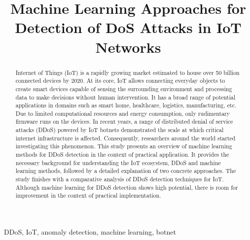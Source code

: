 \documentclass[conference, 11pt]{IEEEtran}
\begin{document}
    \title{Machine Learning Approaches for Detection of DoS Attacks in IoT Networks\\}

    \author{
    }

    \maketitle

    \begin{abstract}
        Internet of Things (IoT) is a rapidly growing market estimated to house over 50 billion connected devices by 2020.
        At its core, IoT allows connecting everyday objects to create smart devices capable of sensing the surrounding environment and processing data to make decisions without human intervention.
        It has a broad range of potential applications in domains such as smart home, healthcare, logistics, manufacturing, etc.
        Due to limited computational resources and energy consumption, only rudimentary firmware runs on the devices.
        In recent years, a range of distributed denial of service attacks (DDoS) powered by IoT botnets demonstrated the scale at which critical internet infrastructure is affected.
        Consequently, researchers around the world started investigating this phenomenon.
        This study presents an overview of machine learning methods for DDoS detection in the context of practical application.
        It provides the necessary background for understanding the IoT ecosystem, DDoS and machine learning methods, followed by a detailed explanation of two concrete approaches.
        The study finishes with a comparative analysis of DDoS detection techniques for IoT.
        Although machine learning for DDoS detection shows high potential, there is room for improvement in the context of practical implementation.
    \end{abstract}

    \begin{IEEEkeywords}
        DDoS, IoT, anomaly detection, machine learning, botnet
    \end{IEEEkeywords}
\end{document}
